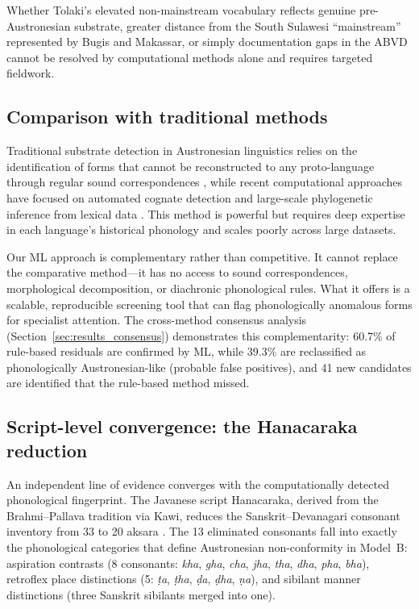 \documentclass[12pt]{article}
\begin{document}
Whether Tolaki's elevated non-mainstream vocabulary reflects genuine pre-Austronesian substrate, greater distance from the South Sulawesi ``mainstream'' represented by Bugis and Makassar, or simply documentation gaps in the ABVD cannot be resolved by computational methods alone and requires targeted fieldwork.

\subsection{Comparison with traditional methods}

Traditional substrate detection in Austronesian linguistics relies on the identification of forms that cannot be reconstructed to any proto-language through regular sound correspondences \citep{blust2009, blust2010}, while recent computational approaches have focused on automated cognate detection \citep{list2012} and large-scale phylogenetic inference from lexical data \citep{jaeger2018}.
This method is powerful but requires deep expertise in each language's historical phonology and scales poorly across large datasets.

Our ML approach is complementary rather than competitive.
It cannot replace the comparative method---it has no access to sound correspondences, morphological decomposition, or diachronic phonological rules.
What it offers is a scalable, reproducible screening tool that can flag phonologically anomalous forms for specialist attention.
The cross-method consensus analysis (Section~\ref{sec:results_consensus}) demonstrates this complementarity: 60.7\% of rule-based residuals are confirmed by ML, while 39.3\% are reclassified as phonologically Austronesian-like (probable false positives), and 41 new candidates are identified that the rule-based method missed.

\subsection{Script-level convergence: the Hanacaraka reduction}
\label{sec:hanacaraka}

An independent line of evidence converges with the computationally detected phonological fingerprint.
The Javanese script Hanacaraka, derived from the Brahmi--Pallava tradition via Kawi, reduces the Sanskrit--Devanagari consonant inventory from 33 to 20 aksara \citep{casparis1975}.
The 13 eliminated consonants fall into exactly the phonological categories that define Austronesian non-conformity in Model~B: aspiration contrasts (8 consonants: \textit{kha}, \textit{gha}, \textit{cha}, \textit{jha}, \textit{tha}, \textit{dha}, \textit{pha}, \textit{bha}), retroflex place distinctions (5: \textit{\d{t}a}, \textit{\d{t}ha}, \textit{\d{d}a}, \textit{\d{d}ha}, \textit{\d{n}a}), and sibilant manner distinctions (three Sanskrit sibilants merged into one).
\end{document}
